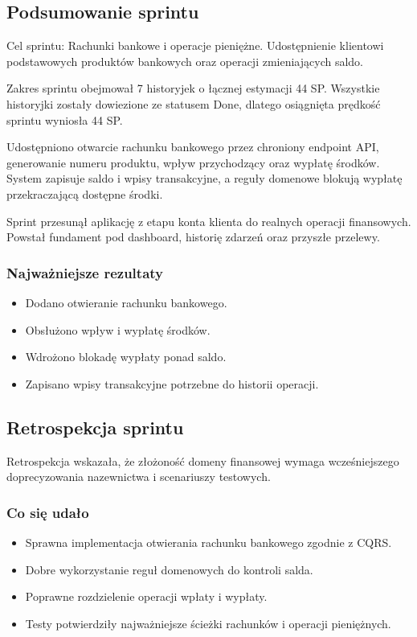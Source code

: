 \documentclass[12pt,a4paper]{article}
\begin{document}
\subsection*{Podsumowanie sprintu}
Cel sprintu: Rachunki bankowe i operacje pieniężne. Udostępnienie klientowi podstawowych produktów bankowych oraz operacji zmieniających saldo.

Zakres sprintu obejmował 7 historyjek o łącznej estymacji 44 SP. Wszystkie historyjki zostały dowiezione ze statusem Done, dlatego osiągnięta prędkość sprintu wyniosła 44 SP.

Udostępniono otwarcie rachunku bankowego przez chroniony endpoint API, generowanie numeru produktu, wpływ przychodzący oraz wypłatę środków. System zapisuje saldo i wpisy transakcyjne, a reguły domenowe blokują wypłatę przekraczającą dostępne środki.

Sprint przesunął aplikację z etapu konta klienta do realnych operacji finansowych. Powstał fundament pod dashboard, historię zdarzeń oraz przyszłe przelewy.

\subsubsection*{Najważniejsze rezultaty}
\begin{itemize}
\item Dodano otwieranie rachunku bankowego.
\item Obsłużono wpływ i wypłatę środków.
\item Wdrożono blokadę wypłaty ponad saldo.
\item Zapisano wpisy transakcyjne potrzebne do historii operacji.
\end{itemize}

\subsection*{Retrospekcja sprintu}
Retrospekcja wskazała, że złożoność domeny finansowej wymaga wcześniejszego doprecyzowania nazewnictwa i scenariuszy testowych.

\subsubsection*{Co się udało}
\begin{itemize}
\item Sprawna implementacja otwierania rachunku bankowego zgodnie z CQRS.
\item Dobre wykorzystanie reguł domenowych do kontroli salda.
\item Poprawne rozdzielenie operacji wpłaty i wypłaty.
\item Testy potwierdziły najważniejsze ścieżki rachunków i operacji pieniężnych.
\end{itemize}
\end{document}
